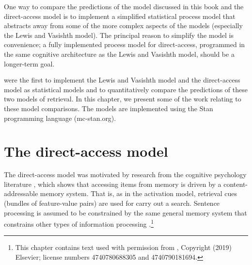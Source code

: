 \documentclass{cambridge7A}\usepackage[]{graphicx}\usepackage[]{color}
\begin{document}
One way to compare the predictions of the model discussed in this book and the direct-access model is to implement a simplified statistical process model that abstracts away from some of the more complex aspects of the models (especially the Lewis and Vasishth model). The principal reason to simplify the model is convenience; a fully implemented process model for direct-access, programmed in the same cognitive architecture as the Lewis and Vasishth model, should be a longer-term goal.  

\cite{NicenboimRetrieval2018} were the first to implement the Lewis and Vasishth model and the direct-access model as statistical models and  to quantitatively compare the predictions of these two models of retrieval. In this chapter, we present some of the work relating to these model comparisons. The models are implemented using the Stan programming language (mc-stan.org).

\section{The direct-access model}

The direct-access model was motivated by research from the cognitive psychology literature \citep{McElree2000,VanDyke2006,McElree2006}, which shows that accessing items from memory is driven by a content-addressable memory system. That is, as in the activation model,  retrieval cues (bundles of feature-value pairs) are used for carry out a search.  Sentence processing is assumed to be constrained by the same general memory system that constrains other types of information processing \citep{McElree1993}.\footnote{This chapter contains text used with permission from \cite{VasishthEtAlTiCS2019}, Copyright (2019) Elsevier; license numbers 4740780688305 and 4740790181694.} 
\end{document}
